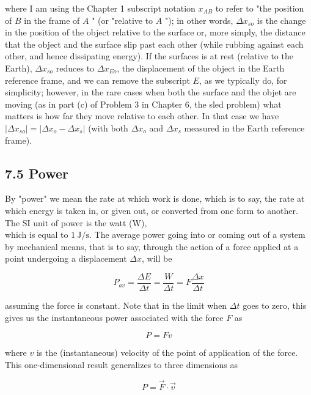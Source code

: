 \documentclass[10pt]{article}
\begin{document}
where I am using the Chapter 1 subscript notation $x_{A B}$ to refer to "the position of $B$ in the frame of $A$ " (or "relative to $A$ "); in other words, $\Delta x_{s o}$ is the change in the position of the object relative to the surface or, more simply, the distance that the object and the surface slip past each other (while rubbing against each other, and hence dissipating energy). If the surfaces is at rest (relative to the Earth), $\Delta x_{s o}$ reduces to $\Delta x_{E o}$, the displacement of the object in the Earth reference frame, and we can remove the subscript $E$, as we typically do, for simplicity; however, in the rare cases when both the surface and the objet are moving (as in part (c) of Problem 3 in Chapter 6, the sled problem) what matters is how far they move relative to each other. In that case we have $\left|\Delta x_{s o}\right|=\left|\Delta x_{o}-\Delta x_{s}\right|$ (with both $\Delta x_{o}$ and $\Delta x_{s}$ measured in the Earth reference frame).

\subsection*{7.5 Power}
By "power" we mean the rate at which work is done, which is to say, the rate at which energy is taken in, or given out, or converted from one form to another. The SI unit of power is the watt (W),\\
which is equal to $1 \mathrm{~J} / \mathrm{s}$. The average power going into or coming out of a system by mechanical means, that is to say, through the action of a force applied at a point undergoing a displacement $\Delta x$, will be


\begin{equation*}
P_{a v}=\frac{\Delta E}{\Delta t}=\frac{W}{\Delta t}=F \frac{\Delta x}{\Delta t} \tag{7.29}
\end{equation*}


assuming the force is constant. Note that in the limit when $\Delta t$ goes to zero, this gives us the instantaneous power associated with the force $F$ as


\begin{equation*}
P=F v \tag{7.30}
\end{equation*}


where $v$ is the (instantaneous) velocity of the point of application of the force. This one-dimensional result generalizes to three dimensions as


\begin{equation*}
P=\vec{F} \cdot \vec{v} \tag{7.31}
\end{equation*}
\end{document}
